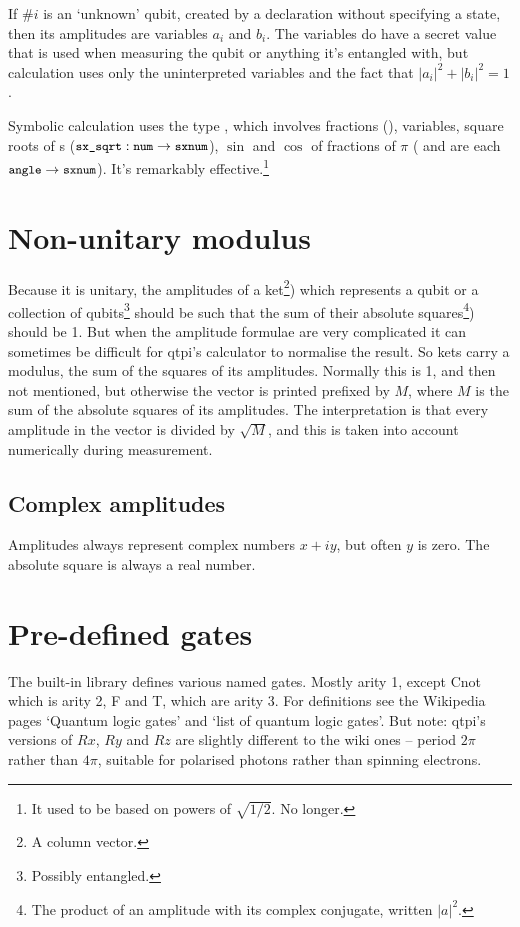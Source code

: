 If $\#i${} is an `unknown' qubit, created by a  declaration without specifying a state, then its amplitudes are variables $a_{i}$ and $b_{i}$. The variables do have a secret value that is used when measuring the qubit or anything it's entangled with, but calculation uses only the uninterpreted variables and the fact that $|a_{i}|^{2}+|b_{i}|^{2}=1$.

Symbolic calculation uses the type , which involves fractions (), variables, square roots of s ($\texttt{\small{}sx\_sqrt}: \texttt{\small{}num}->\texttt{\small{}sxnum}$), $\sin$ and $\cos$ of fractions of $\pi$ ( and  are each $\texttt{\small{}angle}->\texttt{\small{}sxnum}$). It's remarkably effective.\footnote{It used to be based on powers of $\sqrt{1/2}$. No longer.}

\section{Non-unitary modulus}

Because it is unitary, the amplitudes of a ket\footnote{A column vector.}) which represents a qubit or a collection of qubits\footnote{Possibly entangled.} should be such that the sum of their absolute squares\footnote{The product of an amplitude with its complex conjugate, written $|a|^{2}$.}) should be 1. But when the amplitude formulae are very complicated it can sometimes be difficult for qtpi's calculator to normalise the result. So kets carry a modulus, the sum of the squares of its amplitudes. Normally this is 1, and then not mentioned, but otherwise the vector is printed prefixed by \verbtt{<<}$M$\verbtt{>>}, where $M$ is the sum of the absolute squares of its amplitudes. The interpretation is that every amplitude in the vector is divided by $\sqrt{M}$, and this is taken into account numerically during measurement.

\subsection{Complex amplitudes}

Amplitudes always represent complex numbers $x+iy$, but often $y$ is zero. The absolute square is always a real number.

\section{Pre-defined gates}

The built-in library defines various named gates. Mostly arity 1, except Cnot which is arity 2, F and T, which are arity 3. For definitions see the Wikipedia pages `Quantum logic gates' and `list of quantum logic gates'. But note: qtpi's versions of $Rx$, $Ry$ and $Rz$ are slightly different to the wiki ones -- period $2\pi$ rather than $4\pi$, suitable for polarised photons rather than spinning electrons. 

